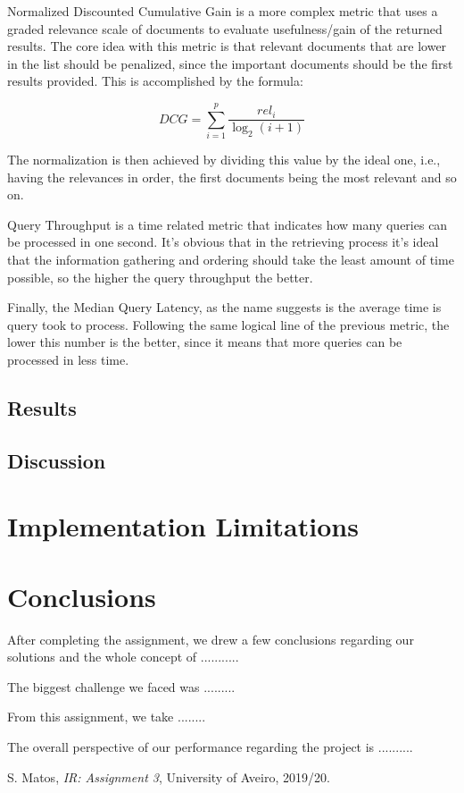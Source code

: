 \documentclass[12pt]{article}
\begin{document}
Normalized Discounted Cumulative Gain is a more complex metric that uses a graded relevance scale of documents to evaluate usefulness/gain of the returned results. The core idea with this metric is that relevant documents that are lower in the list should be penalized, since the important documents should be the first results provided. This is accomplished by the formula:

\begin{equation}
  DCG = \sum_{i=1}^{p} \frac{rel_{i}}{\log_{2}(i+1)}
\end{equation}

The normalization is then achieved by dividing this value by the ideal one, i.e., having the relevances in order, the first documents being the most relevant and so on.

Query Throughput is a time related metric that indicates how many queries can be processed in one second. It's obvious that in the retrieving process it's ideal that the information gathering and ordering should take the least amount of time possible, so the higher the query throughput the better.

Finally, the Median Query Latency, as the name suggests is the average time is query took to process. Following the same logical line of the previous metric, the lower this number is the better, since it means that more queries can be processed in less time.

\subsection{Results}

\subsection{Discussion}

\section{Implementation Limitations}

\section{Conclusions}

After completing the assignment, we drew a few conclusions regarding our
solutions and the whole concept of ...........

The biggest challenge we faced was .........

From this assignment, we take ........

The overall perspective of our performance regarding the project is ..........

\begin{thebibliography}{9}
  

    S. Matos,
    \textit{IR: Assignment 3},
    University of Aveiro,
    2019/20.
  
\end{thebibliography}

\clearpage
\end{document}
